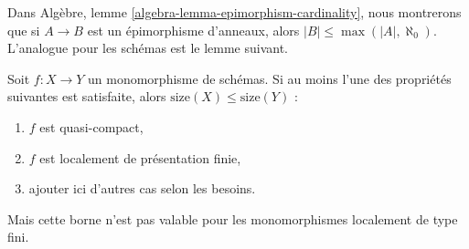 \noindent
Dans Algèbre, lemme \ref{algebra-lemma-epimorphism-cardinality}, nous
montrerons que si $A \to B$ est un épimorphisme d'anneaux, alors
$|B| \leq \max(|A|, \aleph_0)$. L'analogue pour les schémas est le lemme
suivant.

\begin{lemma}
\label{lemma-bound-monomorphism}
Soit $f : X \to Y$ un monomorphisme de schémas. Si au moins l'une des
propriétés suivantes est satisfaite, alors
$\text{size}(X) \leq \text{size}(Y)$ :
\begin{enumerate}
\item $f$ est quasi-compact,
\item $f$ est localement de présentation finie,
\item ajouter ici d'autres cas selon les besoins.
\end{enumerate}
Mais cette borne n'est pas valable pour les monomorphismes localement de type
fini.
\end{lemma}

